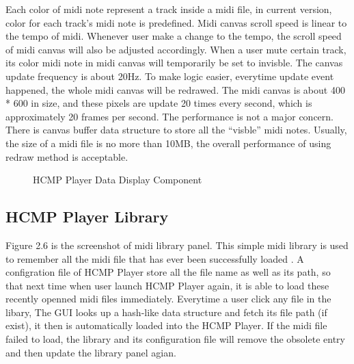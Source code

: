 Each color of midi note represent a track inside 
a midi file, in current version, color for each track's midi note is predefined. 
Midi canvas scroll speed is linear to the tempo of midi. Whenever user 
make a change to the tempo, the scroll speed of midi canvas will also be adjusted 
accordingly. When a user mute certain 
track, its color midi note in midi canvas will temporarily be set to invisble. 
The canvas
update frequency is about 20Hz. To make logic easier, everytime update event 
happened, the whole midi canvas will be redrawed. The midi canvas is about 400 * 600 
in size, and these pixels are update 20 times every second, which is approximately 
20 frames per second. The performance is not
a major concern. There is canvas buffer data 
structure to store all the ``visble'' midi notes. 
Usually, the size of a midi file is no more than 10MB, the overall performance of 
using redraw method is acceptable.

\begin{figure}[H]
\caption{HCMP Player Data Display Component}
\label{fig:speciation}
\end{figure}

\subsection{HCMP Player Library}

Figure 2.6 is the screenshot of midi library panel. This simple midi library is 
used to remember all the midi file that has ever been successfully loaded . 
A configration file of HCMP Player store all the file name as well as its path, 
so that next time when user launch HCMP Player again, it is able to load these 
recently openned midi files immediately. Everytime a user click any file in the libary, 
The GUI looks up a hash-like data structure and fetch its file path (if exist),
it then is automatically
loaded into the HCMP Player. If the midi file failed to load, the library and its
configuration file will remove the obsolete entry and then update the library panel
agian.

